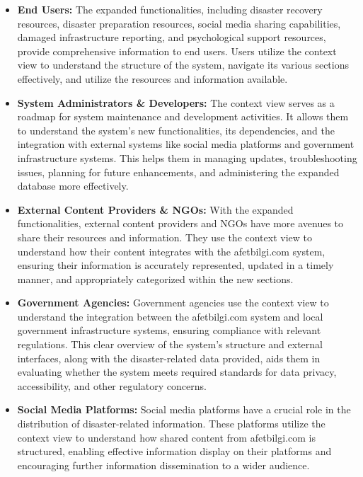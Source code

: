 \documentclass[12pt, letterpaper]{article}
\begin{document}
\begin{itemize}
    \item \textbf{End Users:} The expanded functionalities, including disaster recovery resources, disaster preparation resources, social media sharing capabilities, damaged infrastructure reporting, and psychological support resources, provide comprehensive information to end users. Users utilize the context view to understand the structure of the system, navigate its various sections effectively, and utilize the resources and information available.
    
    \item \textbf{System Administrators \& Developers:} The context view serves as a roadmap for system maintenance and development activities. It allows them to understand the system's new functionalities, its dependencies, and the integration with external systems like social media platforms and government infrastructure systems. This helps them in managing updates, troubleshooting issues, planning for future enhancements, and administering the expanded database more effectively.

    \item \textbf{External Content Providers \& NGOs:} With the expanded functionalities, external content providers and NGOs have more avenues to share their resources and information. They use the context view to understand how their content integrates with the afetbilgi.com system, ensuring their information is accurately represented, updated in a timely manner, and appropriately categorized within the new sections.

    \item \textbf{Government Agencies:} Government agencies use the context view to understand the integration between the afetbilgi.com system and local government infrastructure systems, ensuring compliance with relevant regulations. This clear overview of the system's structure and external interfaces, along with the disaster-related data provided, aids them in evaluating whether the system meets required standards for data privacy, accessibility, and other regulatory concerns.

    \item \textbf{Social Media Platforms:} Social media platforms have a crucial role in the distribution of disaster-related information. These platforms utilize the context view to understand how shared content from afetbilgi.com is structured, enabling effective information display on their platforms and encouraging further information dissemination to a wider audience.
\end{itemize}
\end{document}
